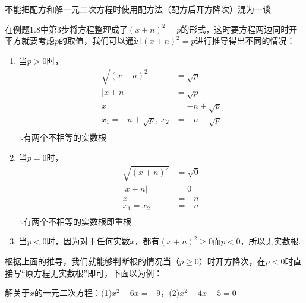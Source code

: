 \documentclass[lang=cn, 10pt, titlestyle=hang, oneside]{elegantbook}
\begin{document}
\par
\begin{remark}
    不能把配方和解一元二次方程时使用配方法（配方后开方降次）混为一谈
\end{remark}
在例题1.8中第3步将方程整理成了\((x + n)^2=p\)的形式，这时要方程两边同时开平方就要考虑\(p\)的取值，我们可以通过\((x + n)^2=p\)进行推导得出不同的情况：
\begin{enumerate}
    \item 当\(p>0\)时，
    \begin{align*}
        \sqrt{(x + n)^2}&=\sqrt{p}\\
        |x+n|&=\sqrt{p}\\
        x&=-n\pm\sqrt{p}\\
        x_1=-n + \sqrt{p},\ x_2&=-n - \sqrt{p}\\
    \end{align*}
    $\therefore \text{有两个不相等的实数根}$
    \item 当\(p=0\)时，
    \begin{align*}
        \sqrt{(x + n)^2}&=\sqrt{0}\\
        |x+n|&=0\\
        x&=-n\\
        x_1=x_2&=-n\\
    \end{align*}
    $\therefore \text{有两个不相等的实数根即重根}$
    \item 当\(p<0\)时，因为对于任何实数\(x\)，都有\((x+n)^2\ge0\)而\(p<0\)，所以无实数根.

\end{enumerate}
根据上面的推导，我们就能够判断根的情况当（\(p\ge0\)）时开方降次，在\(p<0\)时直接写“原方程无实数根”即可，下面以为例：
\par
\begin{example}
    解关于\(x\)的一元二次方程：(1)\( x^2 - 6x = -9 \)，(2)\( x^2 + 4x + 5 = 0 \)
\end{example}
\end{document}
